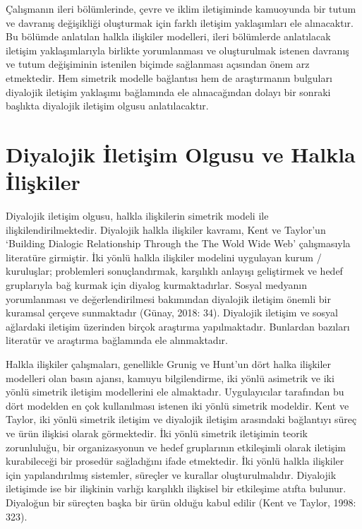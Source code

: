 \documentclass[
]{book}
\begin{document}
Çalışmanın ileri bölümlerinde, çevre ve iklim iletişiminde kamuoyunda bir tutum ve davranış değişikliği oluşturmak için farklı iletişim yaklaşımları ele alınacaktır. Bu bölümde anlatılan halkla ilişkiler modelleri, ileri bölümlerde anlatılacak iletişim yaklaşımlarıyla birlikte yorumlanması ve oluşturulmak istenen davranış ve tutum değişiminin istenilen biçimde sağlanması açısından önem arz etmektedir.
Hem simetrik modelle bağlantısı hem de araştırmanın bulguları diyalojik iletişim yaklaşımı bağlamında ele alınacağından dolayı bir sonraki başlıkta diyalojik iletişim olgusu anlatılacaktır.

\hypertarget{diyalojik-iletiux15fim-olgusu-ve-halkla-iliux15fkiler}{%
\section{Diyalojik İletişim Olgusu ve Halkla İlişkiler}\label{diyalojik-iletiux15fim-olgusu-ve-halkla-iliux15fkiler}}

Diyalojik iletişim olgusu, halkla ilişkilerin simetrik modeli ile ilişkilendirilmektedir. Diyalojik halkla ilişkiler kavramı, Kent ve Taylor'un `Building Dialogic Relationship Through the The Wold Wide Web' çalışmasıyla literatüre girmiştir. İki yönlü halkla ilişkiler modelini uygulayan kurum / kuruluşlar; problemleri sonuçlandırmak, karşılıklı anlayışı geliştirmek ve hedef gruplarıyla bağ kurmak için diyalog kurmaktadırlar. Sosyal medyanın yorumlanması ve değerlendirilmesi bakımından diyalojik iletişim önemli bir kuramsal çerçeve sunmaktadır (Günay, 2018: 34). Diyalojik iletişim ve sosyal ağlardaki iletişim üzerinden birçok araştırma yapılmaktadır. Bunlardan bazıları literatür ve araştırma bağlamında ele alınmaktadır.

Halkla ilişkiler çalışmaları, genellikle Grunig ve Hunt'un dört halka ilişkiler modelleri olan basın ajansı, kamuyu bilgilendirme, iki yönlü asimetrik ve iki yönlü simetrik iletişim modellerini ele almaktadır. Uygulayıcılar tarafından bu dört modelden en çok kullanılması istenen iki yönlü simetrik modeldir. Kent ve Taylor, iki yönlü simetrik iletişim ve diyalojik iletişim arasındaki bağlantıyı süreç ve ürün ilişkisi olarak görmektedir. İki yönlü simetrik iletişimin teorik zorunluluğu, bir organizasyonun ve hedef gruplarının etkileşimli olarak iletişim kurabileceği bir prosedür sağladığını ifade etmektedir. İki yönlü halkla ilişkiler için yapılandırılmış sistemler, süreçler ve kurallar oluşturulmalıdır. Diyalojik iletişimde ise bir ilişkinin varlığı karşılıklı ilişkisel bir etkileşime atıfta bulunur. Diyaloğun bir süreçten başka bir ürün olduğu kabul edilir (Kent ve Taylor, 1998: 323). \citep{kent1998building}
\end{document}
